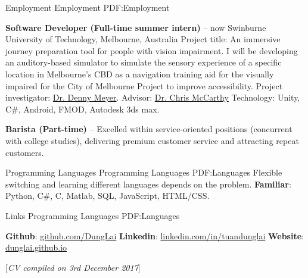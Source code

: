 \documentclass[letterpaper,MMMyyyy,nonstopmode]{simpleresumecv}
\newcommand{\CVNote}{CV compiled on {3rd December 2017}}
\begin{document}
\begin{Body}
\Section 
{Employment}
{Employment}
{PDF:Employment}

\BulletItem
\textbf{Software Developer (Full-time summer intern)}
\hfill
{} --
now
\SubBulletItem Swinburne University of Technology, Melbourne, Australia
\SubBulletItem Project title: An immersive journey preparation tool for people with vision impairment. 
\SubBulletItem I will be developing an auditory-based simulator to simulate the sensory experience of a specific location in Melbourne's CBD as a navigation training aid for the visually impaired for the City of Melbourne Project to improve accessibility.
\SubBulletItem Project investigator: \href{http://www.swinburne.edu.au/health-arts-design/staff/profile/index.php?id=dmeyer}{\color{blue}Dr. Denny Meyer}. Advisor: \href{https://www.swinburne.edu.au/science-engineering-technology/staff/profile/index.php?id=cdmccarthy}{\color{blue}Dr. Chris McCarthy}
\SubBulletItem Technology: Unity, C\#, Android, FMOD, Autodesk 3ds max.

\BulletItem
\textbf{Barista (Part-time)}
\hfill
{} --
\SubBulletItem Excelled within service-oriented positions (concurrent with college studies), delivering premium customer service and attracting repeat customers.

\Section 
{Programming Languages}
{Programming Languages}
{PDF:Languages}
\BulletItem Flexible switching and learning different languages depends on the problem.
\BulletItem \textbf{Familiar}: Python, C\#, C, Matlab, SQL, JavaScript, HTML/CSS.

\Section 
{Links}
{Programming Languages}
{PDF:Languages}

\BulletItem \textbf{Github}: \href{https://github.com/DungLai}{\color{blue}github.com/DungLai}
\BulletItem \textbf{Linkedin}: \href{https://www.linkedin.com/in/tuandunglai/}{\color{blue}linkedin.com/in/tuandunglai}
\BulletItem \textbf{Website}: \href{https://dunglai.github.io/}{\color{blue}dunglai.github.io}
\end{Body}



\BigGap
\UseNoteFont%
\null\hfill%
[\textit{\CVNote}]
\end{document}

